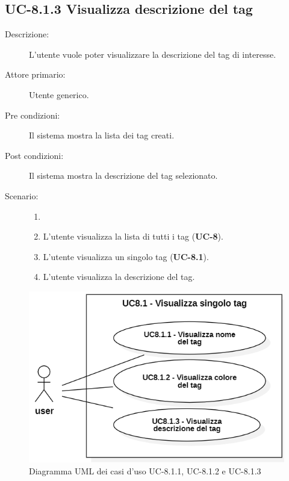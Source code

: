 \subsection{UC-8.1.3 Visualizza descrizione del tag}
\begin{description}
    \item[Descrizione:] L’utente vuole poter visualizzare la descrizione del tag di interesse.
    \item[Attore primario:] Utente generico.
    \item[Pre condizioni:] Il sistema mostra la lista dei tag creati.
    \item[Post condizioni:] Il sistema mostra la descrizione del tag selezionato.
    \item[Scenario:]
    \begin{enumerate}
        \item[]
        \item L’utente visualizza la lista di tutti i tag (\textbf{UC-8}).
        \item L'utente visualizza un singolo tag (\textbf{UC-8.1}).
        \item L'utente visualizza la descrizione del tag.
    \end{enumerate}
\end{description}

\begin{figure}[H]
    \centering
    \includegraphics[width=0.8\linewidth]{UC8.1.1.PNG}
    \caption{Diagramma UML dei casi d'uso UC-8.1.1, UC-8.1.2 e UC-8.1.3}
\end{figure}

